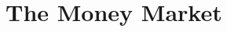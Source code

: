 \documentclass[notoc,notitlepage]{tufte-book}
\begin{document}
\section{The Money Market}%
\label{sec:the_money_market}





\appendix

\backmatter

\fancyhead[LE]{\thepage \enspace \textsl{\leftmark}}



\printindex
\end{document}
